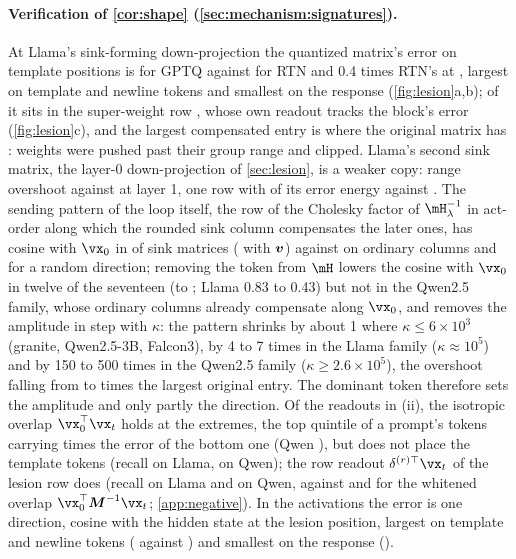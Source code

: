 \paragraph{Verification of \cref{cor:shape} (\cref{sec:mechanism:signatures}).}
At Llama's sink-forming down-projection the quantized matrix's error on template positions is \LtplErrGPTQ{} for GPTQ against \LtplErrRTN{} for RTN and 0.4 times RTN's at \bos{}, largest on template and newline tokens and smallest on the response (\cref{fig:lesion}a,b); \LrowShare{} of it sits in the super-weight row \citep{yu2024superweight}, whose own readout tracks the block's error (\cref{fig:lesion}c), and the largest compensated entry is \LmaxQ{} where the original matrix has \LmaxW{}: weights were pushed past their group range and clipped.
Llama's second sink matrix, the layer-0 down-projection of \cref{sec:lesion}, is a weaker copy: range overshoot \OvershootZero{} against \OvershootOne{} at layer 1, one row with \ToprowZero{} of its error energy against \ToprowOne{}.
The sending pattern of the loop itself, the row of the Cholesky factor of $\hess_\lambda^{-1}$ in act-order along which the rounded sink column compensates the later ones, has cosine \PatCosBos{} with $\vx_0$ in \nPatHit{} of \nPatAll{} sink matrices (\PatCosV{} with $\boldsymbol{v}$) against \PatCosOrd{} on ordinary columns and \PatCosRand{} for a random direction; removing the \bos{} token from $\hess$ lowers the cosine with $\vx_0$ in twelve of the seventeen (to \PatCosNob{}; Llama 0.83 to 0.43) but not in the Qwen2.5 family, whose ordinary columns already compensate along $\vx_0$, and removes the amplitude in step with $\kappa$: the pattern shrinks by about 1 where $\kappa\le6\times10^{3}$ (granite, Qwen2.5-3B, Falcon3), by 4 to 7 times in the Llama family ($\kappa\approx10^{5}$) and by 150 to 500 times in the Qwen2.5 family ($\kappa\ge2.6\times10^{5}$), the overshoot falling from \OvershootWith{} to \OvershootWithout{} times the largest original entry. The dominant token therefore sets the amplitude and only partly the direction.
Of the readouts in (ii), the isotropic overlap $\vx_0^\top\vx_t$ holds at the extremes, the top quintile of a prompt's tokens carrying \LoverlapRatio{} times the error of the bottom one (Qwen \QoverlapRatio{}), but does not place the template tokens (recall \LIsoRecall{} on Llama, \IsoRecall{} on Qwen); the row readout $\delta^{(r)\top}\vx_t$ of the lesion row does (recall \LRowRecall{} on Llama and \RowRecall{} on Qwen, against \LWhiteRecall{} and \WhiteRecall{} for the whitened overlap $\vx_0^\top\mM^{-1}\vx_t$; \cref{app:negative}).
In the activations the error is one direction, cosine \LcosU{} with the \bos{} hidden state at the lesion position, largest on template and newline tokens (\LtplTokErr{} against \LordTokErr{}) and smallest on the response (\LrespTokErr{}).
